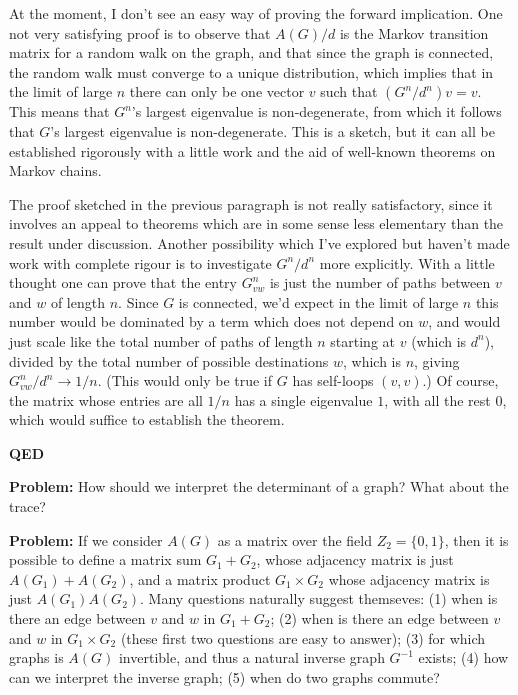 \documentclass[12pt]{article}
\begin{document}
At the moment, I don't see an easy way of proving the forward
implication.  One not very satisfying proof is to observe that
$A(G)/d$ is the Markov transition matrix for a random walk on the
graph, and that since the graph is connected, the random walk must
converge to a unique distribution, which implies that in the limit of
large $n$ there can only be one vector $v$ such that $(G^n/d^n) v =
v$.  This means that $G^n$'s largest eigenvalue is non-degenerate,
from which it follows that $G$'s largest eigenvalue is non-degenerate.
This is a sketch, but it can all be established rigorously with a
little work and the aid of well-known theorems on Markov chains.

The proof sketched in the previous paragraph is not really
satisfactory, since it involves an appeal to theorems which are in
some sense less elementary than the result under discussion.  Another
possibility which I've explored but haven't made work with complete
rigour is to investigate $G^n/d^n$ more explicitly.  With a little
thought one can prove that the entry $G^n_{vw}$ is just the number of
paths between $v$ and $w$ of length $n$.  Since $G$ is connected, we'd
expect in the limit of large $n$ this number would be dominated by a
term which does not depend on $w$, and would just scale like the total
number of paths of length $n$ starting at $v$ (which is $d^n$),
divided by the total number of possible destinations $w$, which is
$n$, giving $G^n_{vw}/d^n \rightarrow 1/n$.  (This would only be true
if $G$ has self-loops $(v,v)$.)  Of course, the matrix whose entries
are all $1/n$ has a single eigenvalue $1$, with all the rest $0$,
which would suffice to establish the theorem.

\textbf{QED}

\textbf{Problem:} How should we interpret the determinant of a graph?
What about the trace?

\textbf{Problem:} If we consider $A(G)$ as a matrix over the field
$Z_2 = \{0,1\}$, then it is possible to define a matrix sum $G_1+G_2$,
whose adjacency matrix is just $A(G_1)+A(G_2)$, and a matrix product
$G_1 \times G_2$ whose adjacency matrix is just $A(G_1) A(G_2)$.  Many
questions naturally suggest themseves: (1) when is there an edge
between $v$ and $w$ in $G_1+G_2$; (2) when is there an edge between
$v$ and $w$ in $G_1 \times G_2$ (these first two questions are easy to
answer); (3) for which graphs is $A(G)$ invertible, and thus a natural
inverse graph $G^{-1}$ exists; (4) how can we interpret the inverse
graph; (5) when do two graphs commute?
\end{document}
